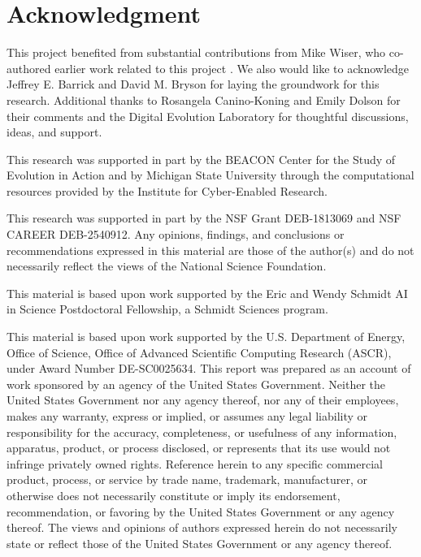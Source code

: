 \section*{Acknowledgment}

This project benefited from substantial contributions from Mike Wiser, who co-authored earlier work related to this project \citep{lalejini2017gene}.
We also would like to acknowledge Jeffrey E. Barrick and David M. Bryson for laying the groundwork for this research.
Additional thanks to Rosangela Canino-Koning and Emily Dolson for their comments and the Digital Evolution Laboratory for thoughtful discussions, ideas, and support.

This research was supported in part by the BEACON Center for the Study of Evolution in Action and by Michigan State University through the computational resources provided by the Institute for Cyber-Enabled Research.

This research was supported in part by the NSF Grant DEB-1813069 and NSF CAREER DEB-2540912.
Any opinions, findings, and conclusions or recommendations expressed in this material are those of the author(s) and do not necessarily reflect the views of the National Science Foundation.

This material is based upon work supported by the Eric and Wendy Schmidt AI in Science Postdoctoral Fellowship, a Schmidt Sciences program.

This material is based upon work supported by the U.S. Department of Energy, Office of Science, Office of Advanced Scientific Computing Research (ASCR), under Award Number DE-SC0025634.
This report was prepared as an account of work sponsored by an agency of the United States Government.
Neither the United States Government nor any agency thereof, nor any of their employees, makes any warranty, express or implied, or assumes any legal liability or responsibility for the accuracy, completeness, or usefulness of any information, apparatus, product, or process disclosed, or represents that its use would not infringe privately owned rights.
Reference herein to any specific commercial product, process, or service by trade name, trademark, manufacturer, or otherwise does not necessarily constitute or imply its endorsement, recommendation, or favoring by the United States Government or any agency thereof.
The views and opinions of authors expressed herein do not necessarily state or reflect those of the United States Government or any agency thereof.
